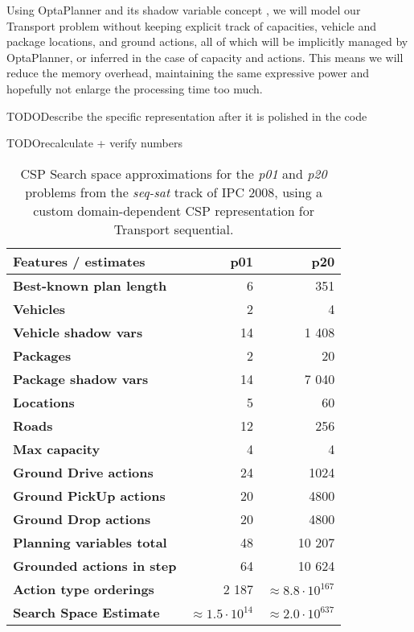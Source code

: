 {Using OptaPlanner and its shadow variable concept \citep[Section~4.3.6]{DeSmet2017}, we will model our Transport problem without keeping explicit track of capacities,
vehicle and package locations, and ground actions, all of which will be implicitly managed by OptaPlanner, or inferred in the case of capacity and actions.
This means we will reduce the memory overhead, maintaining the same expressive power
and hopefully not enlarge the processing time too much.

TODO{Describe the specific representation after it is polished in the code}

TODO{recalculate + verify numbers}

\begin{table}[tb]
\begin{center}
\begin{tabular}{l||rr}
\textbf{Features / estimates} & \textbf{p01} & \textbf{p20} \\ 
\midrule
\midrule
\textbf{Best-known plan length} & 6 & 351 \\ 
\textbf{Vehicles} & 2 & 4 \\ 
\textbf{Vehicle shadow vars} & 14 & 1 408 \\
\textbf{Packages} & 2 & 20 \\ 
\textbf{Package shadow vars} & 14 & 7 040 \\
\textbf{Locations} & 5 & 60 \\
\textbf{Roads} & 12 & 256 \\
\textbf{Max capacity} & 4 & 4 \\ 
\midrule
\textbf{Ground Drive actions} & 24 & 1024 \\ 
\textbf{Ground PickUp actions} & 20 & 4800 \\ 
\textbf{Ground Drop actions} & 20 & 4800 \\ 
\midrule
\textbf{Planning variables total} & 48 & 10 207 \\ 
\textbf{Grounded actions in step} & 64 & 10 624 \\ 
\textbf{Action type orderings} & 2 187 & $\approx 8.8 \cdot 10^{167}$ \\ 
\textbf{Search Space Estimate} & $\approx 1.5 \cdot 10^{14}$ & $\approx 2.0 \cdot 10^{637}$ \\
\end{tabular}
\end{center}
\caption[Search space approximations for a domain-dependent CSP representation.]{CSP Search space approximations for the \textit{p01} and \textit{p20} problems from the \textit{seq-sat} track of IPC 2008, using a custom domain-dependent CSP representation for Transport sequential.}
\label{tab:csp-custom}
\end{table}

}
